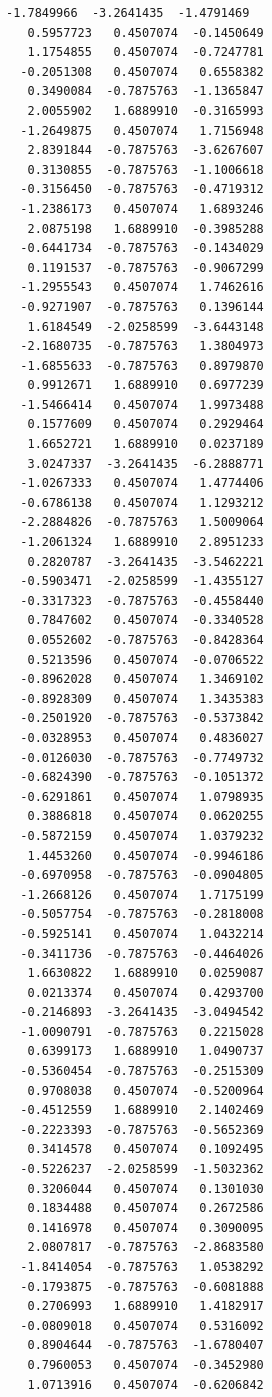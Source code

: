 \documentclass[11pt]{article}
\begin{document}
\begin{Verbatim}[commandchars=\\\{\}]
  -1.7849966  -3.2641435  -1.4791469
   0.5957723   0.4507074  -0.1450649
   1.1754855   0.4507074  -0.7247781
  -0.2051308   0.4507074   0.6558382
   0.3490084  -0.7875763  -1.1365847
   2.0055902   1.6889910  -0.3165993
  -1.2649875   0.4507074   1.7156948
   2.8391844  -0.7875763  -3.6267607
   0.3130855  -0.7875763  -1.1006618
  -0.3156450  -0.7875763  -0.4719312
  -1.2386173   0.4507074   1.6893246
   2.0875198   1.6889910  -0.3985288
  -0.6441734  -0.7875763  -0.1434029
   0.1191537  -0.7875763  -0.9067299
  -1.2955543   0.4507074   1.7462616
  -0.9271907  -0.7875763   0.1396144
   1.6184549  -2.0258599  -3.6443148
  -2.1680735  -0.7875763   1.3804973
  -1.6855633  -0.7875763   0.8979870
   0.9912671   1.6889910   0.6977239
  -1.5466414   0.4507074   1.9973488
   0.1577609   0.4507074   0.2929464
   1.6652721   1.6889910   0.0237189
   3.0247337  -3.2641435  -6.2888771
  -1.0267333   0.4507074   1.4774406
  -0.6786138   0.4507074   1.1293212
  -2.2884826  -0.7875763   1.5009064
  -1.2061324   1.6889910   2.8951233
   0.2820787  -3.2641435  -3.5462221
  -0.5903471  -2.0258599  -1.4355127
  -0.3317323  -0.7875763  -0.4558440
   0.7847602   0.4507074  -0.3340528
   0.0552602  -0.7875763  -0.8428364
   0.5213596   0.4507074  -0.0706522
  -0.8962028   0.4507074   1.3469102
  -0.8928309   0.4507074   1.3435383
  -0.2501920  -0.7875763  -0.5373842
  -0.0328953   0.4507074   0.4836027
  -0.0126030  -0.7875763  -0.7749732
  -0.6824390  -0.7875763  -0.1051372
  -0.6291861   0.4507074   1.0798935
   0.3886818   0.4507074   0.0620255
  -0.5872159   0.4507074   1.0379232
   1.4453260   0.4507074  -0.9946186
  -0.6970958  -0.7875763  -0.0904805
  -1.2668126   0.4507074   1.7175199
  -0.5057754  -0.7875763  -0.2818008
  -0.5925141   0.4507074   1.0432214
  -0.3411736  -0.7875763  -0.4464026
   1.6630822   1.6889910   0.0259087
   0.0213374   0.4507074   0.4293700
  -0.2146893  -3.2641435  -3.0494542
  -1.0090791  -0.7875763   0.2215028
   0.6399173   1.6889910   1.0490737
  -0.5360454  -0.7875763  -0.2515309
   0.9708038   0.4507074  -0.5200964
  -0.4512559   1.6889910   2.1402469
  -0.2223393  -0.7875763  -0.5652369
   0.3414578   0.4507074   0.1092495
  -0.5226237  -2.0258599  -1.5032362
   0.3206044   0.4507074   0.1301030
   0.1834488   0.4507074   0.2672586
   0.1416978   0.4507074   0.3090095
   2.0807817  -0.7875763  -2.8683580
  -1.8414054  -0.7875763   1.0538292
  -0.1793875  -0.7875763  -0.6081888
   0.2706993   1.6889910   1.4182917
  -0.0809018   0.4507074   0.5316092
   0.8904644  -0.7875763  -1.6780407
   0.7960053   0.4507074  -0.3452980
   1.0713916   0.4507074  -0.6206842

\end{Verbatim}
\end{document}
